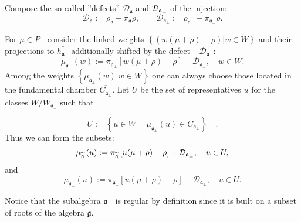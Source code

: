 \documentclass[preprint,12pt]{elsarticle}
\newcommand{\af}{\mathfrak{a}}
\newcommand{\afb}{\mathfrak{a}_{\bot}}
\begin{document}
Compose the so called ''defects'' $\mathcal{D}_{\af}$ and $\mathcal{%
D}_{\afb}$ of the injection:
\begin{equation}
\mathcal{D}_{\af}:=\rho _{\af}-\pi _{\af}\rho , \qquad
\mathcal{D}_{\afb}:=\rho _{\afb}-\pi _{\af%
_{\perp }}\rho .  \label{defect-ort}
\end{equation}

For $\mu \in P^{+}$ consider the linked weights $\left\{ \left(
w(\mu +\rho )-\rho \right) |w\in W\right\} $ and their projections
to
$h_{\afb}^{\ast }$ additionally shifted by the defect $-%
\mathcal{D}_{\afb}$:
\begin{equation*}
\mu _{\afb}\left( w\right) :=\pi _{\afb}\left[
w(\mu +\rho )-\rho \right] -\mathcal{D}_{\afb},\quad w\in W.
\end{equation*}
Among the weights $\left\{ \mu _{\af_{\perp
}}\left( w\right) |w\in W\right\} $ one can always choose those located in
the fundamental chamber $\overline{C_{\afb}}$. Let $U$ be the
set of representatives $u$ for the classes $W/W_{\afb}$ such
that

\begin{equation}
U:=\left\{ u\in W|\quad \mu _{\afb}\left( u\right) \in
\overline{C_{\afb}}\right\} \quad .  \label{U-def}
\end{equation}
Thus we can form the subsets:
\begin{equation}
\mu _{\widetilde{\mathfrak{a}}}\left( u\right) :=\pi _{\widetilde{%
\mathfrak{a}}}\left[ u(\mu +\rho )-\rho \right] +\mathcal{D}_{\af%
_{\perp }},\quad u\in U,  \label{mu-a}
\end{equation}
and
\begin{equation}
\mu _{\afb}\left( u\right) :=\pi _{\afb}\left[
u(\mu +\rho )-\rho \right] -\mathcal{D}_{\afb},\quad u\in U.
\label{mu-a-tilda}
\end{equation}

Notice that the subalgebra $\mathfrak{a}_{\bot}$ is regular by definition
since it is built on a subset of roots of the algebra $\mathfrak{g}$.
\end{document}
